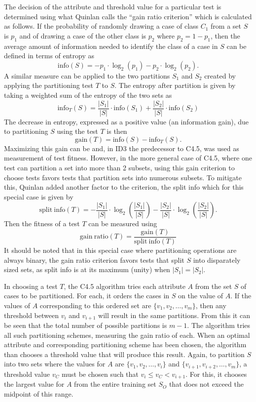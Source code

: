 \documentclass[main.tex]{subfiles}
\begin{document}
The decision of the attribute and threshold value for a particular test is determined using what Quinlan calls the ``gain ratio criterion'' which is calculated as follows. If the probability of randomly drawing a case of class $C_1$ from a set $S$ is $p_1$ and of drawing a case of the other class is $p_2$ where $p_2 = 1-p_1$, then the average amount of information needed to identify the class of a case in $S$ can be defined in terms of entropy as
\[
\mathrm{info}(S)=-p_1 \cdot \log_2(p_1) - p_2 \cdot \log_2(p_2).
\]
A similar measure can be applied to the two partitions $S_1$ and $S_2$ created by applying the partitioning test $T$ to $S$. The entropy after partition is given by taking a weighted sum of the entropy of the two sets as
\[
\mathrm{info}_T(S)=\frac{|S_1|}{|S|} \cdot \mathrm{info}(S_1) + \frac{|S_2|}{|S|} \cdot \mathrm{info}(S_2)
\]
The decrease in entropy, expressed as a positive value (an information gain), due to partitioning $S$ using the test $T$ is then
\[
\mathrm{gain}(T)=\mathrm{info}(S)-\mathrm{info}_T(S).
\]
Maximizing this gain can be and, in ID3 the predecessor to C4.5, was used as measurement of test fitness. However, in the more general case of C4.5, where one test can partition a set into more than 2 subsets, using this gain criterion to choose tests favors tests that partition sets into numerous subsets. To mitigate this, Quinlan added another factor to the criterion, the split info which for this special case is given by
\[
\mathrm{split\ info}(T)= -\frac{|S_1|}{|S|} \cdot \log_2 \left( \frac{|S_1|}{|S|} \right) - \frac{|S_2|}{|S|} \cdot \log_2  \left( \frac{|S_2|}{|S|}  \right).
\]
Then the fitness of a test $T$ can be measured using
\[
\mathrm{gain\ ratio}(T) = \frac{\mathrm{gain}(T)}{\mathrm{split\ info}(T)}
\]
It should be noted that in this special case where partitioning operations are always binary, the gain ratio criterion favors tests that split $S$ into disparately sized sets, as split info is at its maximum (unity) when $|S_1|=|S_2|$.

In choosing a test $T$, the C4.5 algorithm tries each attribute $A$ from the set $S$ of cases to be partitioned. For each, it orders the cases in $S$ on the value of $A$. If the values of $A$ corresponding to this ordered set are $\{v_1,v_2,\ldots,v_m\}$, then any threshold between $v_i$ and $v_{i+1}$ will result in the same partitions. From this it can be seen that the total number of possible partitions is $m-1$. The algorithm tries all such partitioning schemes, measuring the gain ratio of each. When an optimal attribute and corresponding partitioning scheme has been chosen, the algorithm than chooses a threshold value that will produce this result. Again, to partition $S$ into two sets where the values for $A$ are $\{v_1,v_2,\ldots,v_i\}$ and $\{v_{i+1},v_{i+2},\ldots,v_m\}$, a threshold value $v_C$ must be chosen such that $v_i \leq v_C < v_{i+1}$. For this, it chooses the largest value for $A$ from the entire training set $S_O$ that does not exceed the midpoint of this range. 



\biblio
\end{document}
